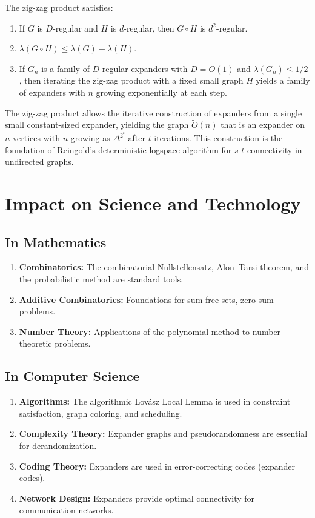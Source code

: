 \begin{theorem}
The zig-zag product satisfies:
\begin{enumerate}
    \item If $G$ is $D$-regular and $H$ is $d$-regular, then $G \circ H$ is $d^2$-regular.
    \item $\lambda(G \circ H) \leq \lambda(G) + \lambda(H)$.
    \item If $G_n$ is a family of $D$-regular expanders with $D = O(1)$ and $\lambda(G_n) \leq 1/2$, then iterating the zig-zag product with a fixed small graph $H$ yields a family of expanders with $n$ growing exponentially at each step.
\end{enumerate}
\end{theorem}

The zig-zag product allows the iterative construction of expanders from a single small constant-sized expander, yielding the graph $\tilde{O}(n)$ that is an expander on $n$ vertices with $n$ growing as $\Delta^{2^t}$ after $t$ iterations. This construction is the foundation of Reingold's deterministic logspace algorithm for $s$-$t$ connectivity in undirected graphs.

\section{Impact on Science and Technology}

\subsection{In Mathematics}

\begin{enumerate}
    \item \textbf{Combinatorics:} The combinatorial Nullstellensatz, Alon--Tarsi theorem, and the probabilistic method are standard tools.
    \item \textbf{Additive Combinatorics:} Foundations for sum-free sets, zero-sum problems.
    \item \textbf{Number Theory:} Applications of the polynomial method to number-theoretic problems.
\end{enumerate}

\subsection{In Computer Science}

\begin{enumerate}
    \item \textbf{Algorithms:} The algorithmic Lov\'asz Local Lemma is used in constraint satisfaction, graph coloring, and scheduling.
    \item \textbf{Complexity Theory:} Expander graphs and pseudorandomness are essential for derandomization.
    \item \textbf{Coding Theory:} Expanders are used in error-correcting codes (expander codes).
    \item \textbf{Network Design:} Expanders provide optimal connectivity for communication networks.
\end{enumerate}

